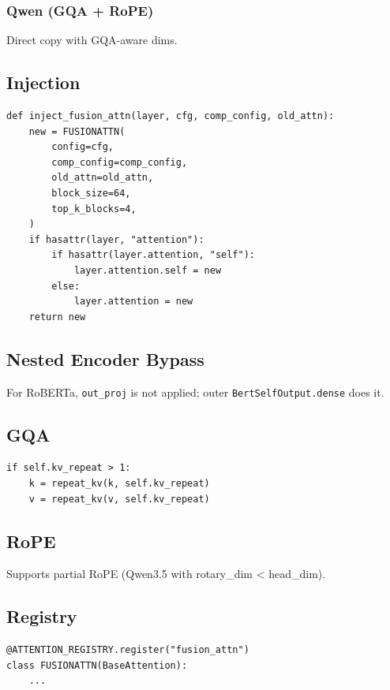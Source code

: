\subsubsection{Qwen (GQA + RoPE)}
Direct copy with GQA-aware dims.

\subsection{Injection}

\begin{lstlisting}
def inject_fusion_attn(layer, cfg, comp_config, old_attn):
    new = FUSIONATTN(
        config=cfg,
        comp_config=comp_config,
        old_attn=old_attn,
        block_size=64,
        top_k_blocks=4,
    )
    if hasattr(layer, "attention"):
        if hasattr(layer.attention, "self"):
            layer.attention.self = new
        else:
            layer.attention = new
    return new
\end{lstlisting}

\subsection{Nested Encoder Bypass}

For RoBERTa, \texttt{out\_proj} is not applied; outer \texttt{BertSelfOutput.dense} does it.

\subsection{GQA}

\begin{lstlisting}
if self.kv_repeat > 1:
    k = repeat_kv(k, self.kv_repeat)
    v = repeat_kv(v, self.kv_repeat)
\end{lstlisting}

\subsection{RoPE}

Supports partial RoPE (Qwen3.5 with rotary\_dim < head\_dim).

\subsection{Registry}

\begin{lstlisting}
@ATTENTION_REGISTRY.register("fusion_attn")
class FUSIONATTN(BaseAttention):
    ...
\end{lstlisting}

